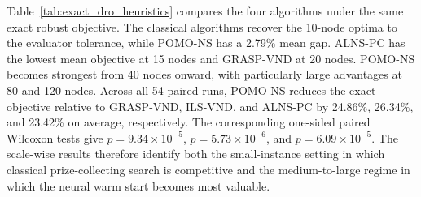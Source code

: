 \documentclass[preprint,12pt,authoryear]{elsarticle}
\theoremstyle{definition}
\begin{document}
{Table~\ref{tab:exact_dro_heuristics} compares the four algorithms under the same exact robust objective. The classical algorithms recover the 10-node optima to the evaluator tolerance, while POMO-NS has a 2.79\% mean gap. ALNS-PC has the lowest mean objective at 15 nodes and GRASP-VND at 20 nodes. POMO-NS becomes strongest from 40 nodes onward, with particularly large advantages at 80 and 120 nodes. Across all 54 paired runs, POMO-NS reduces the exact objective relative to GRASP-VND, ILS-VND, and ALNS-PC by 24.86\%, 26.34\%, and 23.42\% on average, respectively. The corresponding one-sided paired Wilcoxon tests give $p=9.34\times10^{-5}$, $p=5.73\times10^{-6}$, and $p=6.09\times10^{-5}$. The scale-wise results therefore identify both the small-instance setting in which classical prize-collecting search is competitive and the medium-to-large regime in which the neural warm start becomes most valuable.

\begin{table}[htbp]
\centering
\caption{Strong-heuristic comparison under the same exact Wasserstein DRO objective. Entries are mean $\pm$ standard deviation in $\times10^3$ over three instances and three seeds; lower is better.}
\label{tab:exact_dro_heuristics}
\small
{}
\end{table}

}
\end{document}
